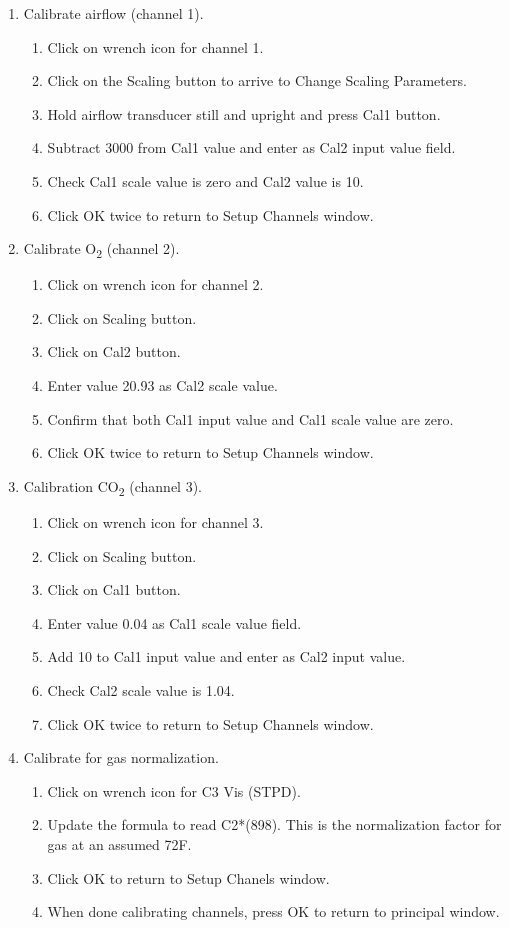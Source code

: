 \documentclass{article}
\begin{document}
\begin{enumerate}
	\item Calibrate airflow (channel 1).\begin{enumerate}
	\item Click on wrench icon for channel 1.
	\item Click on the Scaling button to arrive to Change Scaling Parameters.
	\item Hold airflow transducer still and upright and press Cal1 button.
	\item Subtract 3000 from Cal1 value and enter as Cal2 input value field.
	\item Check Cal1 scale value is zero and Cal2 value is 10.
	\item Click OK twice to return to Setup Channels window.
	\end{enumerate}
	
	\item Calibrate O\textsubscript{2} (channel 2).
	\begin{enumerate}
		\item Click on wrench icon for channel 2.
		\item Click on Scaling button.
		\item Click on Cal2 button.
		\item Enter value 20.93 as Cal2 scale value.
		\item Confirm that both Cal1 input value and Cal1 scale value are zero.
		\item Click OK twice to return to Setup Channels window.
	\end{enumerate}
	
	\item Calibration CO\textsubscript{2} (channel 3).
	\begin{enumerate}
		\item Click on wrench icon for channel 3.
		\item Click on Scaling button.
		\item Click on Cal1 button.
		\item Enter value 0.04 as Cal1 scale value field.
		\item Add 10 to Cal1 input value and enter as Cal2 input value.
		\item Check Cal2 scale value is 1.04.
		\item Click OK twice to return to Setup Channels window.
	\end{enumerate}
	
	\item Calibrate for gas normalization.
	\begin{enumerate}
		\item Click on wrench icon for C3 Vis (STPD).
		\item Update the formula to read C2*(898). This is the normalization factor for gas at an assumed 72\degree F.
		\item Click OK to return to Setup Chanels window.
		\item When done calibrating channels, press OK to return to principal window.
	\end{enumerate}
\end{enumerate}
\end{document}
